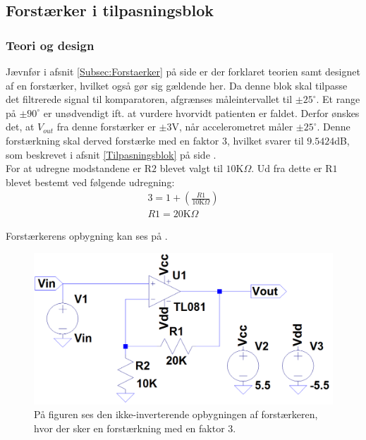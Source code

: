 \subsection{Forstærker i tilpasningsblok}
\subsubsection{Teori og design}
Jævnfør i afsnit \ref{Subsec:Forstaerker} på side \pageref{Subsec:Forstaerker} er der forklaret teorien samt designet af en forstærker, hvilket også gør sig gældende her. Da denne blok skal tilpasse det filtrerede signal til komparatoren, afgrænses måleintervallet til $\pm25^{\circ}$. Et range på $\pm90^{\circ}$ er unødvendigt ift. at vurdere hvorvidt patienten er faldet. Derfor ønskes det, at $V_{out}$ fra denne forstærker er $\pm3$V, når accelerometret måler $\pm25^{\circ}$. Denne forstærkning skal derved forstærke med en faktor 3, hvilket svarer til $9.5424$dB, som beskrevet i afsnit \ref{Tilpasningsblok} på side \pageref{Tilpasningsblok}. \\
For at udregne modstandene er R$2$ blevet valgt til $10$K$\Omega$. Ud fra dette er R$1$ blevet bestemt ved følgende udregning:
\begin{align}
3 = 1 + (\frac{R1}{10\text{K}\Omega})\\
R1 = 20\text{K}\Omega
\end{align}

\noindent Forstærkerens opbygning kan ses på .
\begin{figure}[H]
	\centering
	\includegraphics[scale=0.3]{figures/cProblemloesning/Forstaerker_faktor3.PNG}
	\caption{På figuren ses den ikke-inverterende opbygningen af forstærkeren, hvor der sker en forstærkning med en faktor $3$.}
	\label{fig:Forstaerker_faktor3}
\end{figure}


